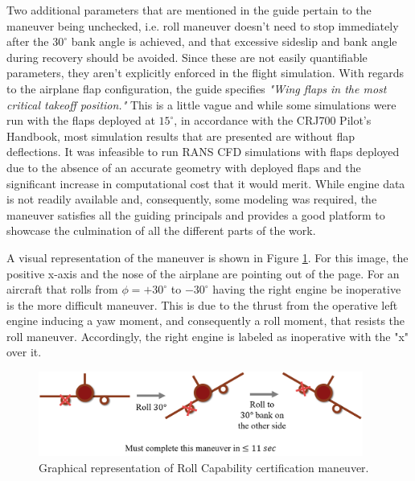 Two additional parameters that are mentioned in the guide pertain to the maneuver being unchecked, i.e. roll maneuver doesn't need to stop immediately after the $30 ^\circ$ bank angle is achieved, and that excessive sideslip and bank angle during recovery should be avoided.
Since these are not easily quantifiable parameters, they aren't explicitly enforced in the flight simulation.
With regards to the airplane flap configuration, the guide specifies \textit{"Wing flaps in the most critical takeoff position."}
This is a little vague and while some simulations were run with the flaps deployed at $15^\circ$, in accordance with the CRJ700 Pilot's Handbook, most simulation results that are presented are without flap deflections. 
It was infeasible to run RANS CFD simulations with flaps deployed due to the absence of an accurate geometry with deployed flaps and the significant increase in computational cost that it would merit.  
While engine data is not readily available and, consequently, some modeling was required, the maneuver satisfies all the guiding principals and provides a good platform to showcase the culmination of all the different parts of the work.

A visual representation of the maneuver is shown in Figure \ref{fig:roll_maneuver}. 
For this image, the positive x-axis and the nose of the airplane are pointing out of the page.
For an aircraft that rolls from $\phi = +30^\circ$ to $-30^\circ$ having the right engine be inoperative is the more difficult maneuver.
This is due to the thrust from the operative left engine inducing a yaw moment, and consequently a roll moment, that resists the roll maneuver.
Accordingly, the right engine is labeled as inoperative with the "x" over it.

\begin{figure}
    \center
    \includegraphics[width=0.95\textwidth]{suthesis/images/roll_maneuver.png}
    \caption{Graphical representation of Roll Capability certification maneuver. \label{fig:roll_maneuver}}
\end{figure}